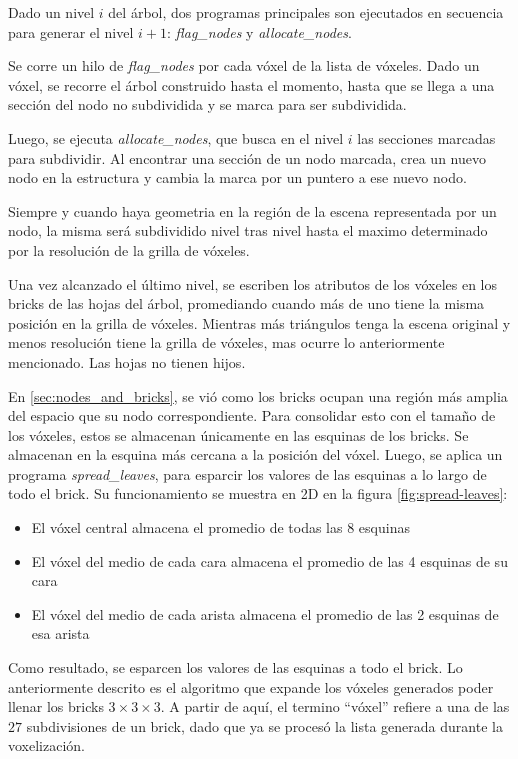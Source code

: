 
Dado un nivel $i$ del árbol, dos programas principales son ejecutados en secuencia para generar el nivel $i + 1$: \textit{flag\_nodes} y \textit{allocate\_nodes}.

Se corre un hilo de \textit{flag\_nodes} por cada vóxel de la lista de vóxeles.
Dado un vóxel, se recorre el árbol construido hasta el momento, hasta que se llega a una sección del nodo no subdividida y se marca para ser subdividida.

Luego, se ejecuta \textit{allocate\_nodes}, que busca en el nivel $i$ las secciones marcadas para subdividir.
Al encontrar una sección de un nodo marcada, crea un nuevo nodo en la estructura y cambia la marca por un puntero a ese nuevo nodo.

Siempre y cuando haya geometria en la región de la escena representada por un nodo, la misma será subdividido nivel tras nivel hasta el maximo determinado por la resolución de la grilla de vóxeles.

Una vez alcanzado el último nivel, se escriben los atributos de los vóxeles en los bricks de las hojas del árbol, promediando cuando más de uno tiene la misma posición en la grilla de vóxeles.
Mientras más triángulos tenga la escena original y menos resolución tiene la grilla de vóxeles, mas ocurre lo anteriormente mencionado.
Las hojas no tienen hijos.

En \ref{sec:nodes_and_bricks}, se vió como los bricks ocupan una región más amplia del espacio que su nodo correspondiente.
Para consolidar esto con el tamaño de los vóxeles, estos se almacenan únicamente en las esquinas de los bricks. %
Se almacenan en la esquina más cercana a la posición del vóxel.
Luego, se aplica un programa \textit{spread\_leaves}, para esparcir los valores de las esquinas a lo largo de todo el brick.
Su funcionamiento se muestra en 2D en la figura \ref{fig:spread-leaves}:
\begin{itemize}
    \item El vóxel central almacena el promedio de todas las 8 esquinas
    \item El vóxel del medio de cada cara almacena el promedio de las 4 esquinas de su cara
    \item El vóxel del medio de cada arista almacena el promedio de las 2 esquinas de esa arista
\end{itemize}
Como resultado, se esparcen los valores de las esquinas a todo el brick.
Lo anteriormente descrito es el algoritmo que expande los vóxeles generados poder llenar los bricks $3\times3\times3$.
A partir de aquí, el termino ``vóxel'' refiere a una de las $27$ subdivisiones de un brick, dado que ya se procesó la lista generada durante la voxelización.

